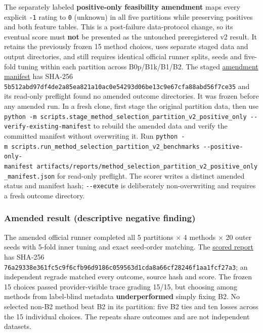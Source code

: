 \documentclass[
  10pt,
]{ctexart}
\begin{document}
The separately labeled \textbf{positive-only feasibility amendment} maps
every explicit \texttt{-1} rating to \texttt{0} (unknown) in all five
partitions while preserving positives and both feature tables. This is a
post-failure data-protocol change, so its eventual score must
\textbf{not} be presented as the untouched preregistered v2 result. It
retains the previously frozen 15 method choices, uses separate staged
data and output directories, and still requires identical official
runner splits, seeds and five-fold tuning within each partition across
B0p/B1k/B1/B2. The staged
\href{../artifacts/reports/method_selection_partition_v2_positive_only_manifest.json}{amendment
manifest} has SHA-256
\texttt{5b512abd97df4d\allowbreak{}e2a85ea821a10a\allowbreak{}c0e54293d06be1\allowbreak{}3c9e67cfa88abd\allowbreak{}56f7ce35}
and its read-only preflight found no amended outcome directories. It was
frozen before any amended run. In a fresh clone, first stage the
original partition data, then use
\texttt{python\ -m\ scripts.\allowbreak{}stage\_\allowbreak{}method\_\allowbreak{}selection\_\allowbreak{}partition\_\allowbreak{}v2\_\allowbreak{}positive\_\allowbreak{}only\ -\/\allowbreak{}-verify-existing-manifest}
to rebuild the amended data and verify the committed manifest without
overwriting it. Run
\texttt{python\ -m\ scripts.\allowbreak{}run\_\allowbreak{}method\_\allowbreak{}selection\_\allowbreak{}partition\_\allowbreak{}v2\_\allowbreak{}benchmarks\ -\/\allowbreak{}-positive-only-manifest\ artifacts/\allowbreak{}reports/\allowbreak{}method\_\allowbreak{}selection\_\allowbreak{}partition\_\allowbreak{}v2\_\allowbreak{}positive\_\allowbreak{}only\_\allowbreak{}manifest.\allowbreak{}json}
for read-only preflight. The scorer writes a distinct amended status and
manifest hash; \texttt{-\/\allowbreak{}-execute} is deliberately non-overwriting and
requires a fresh outcome directory.

\subsubsection{Amended result (descriptive negative
finding)}\label{amended-result-descriptive-negative-finding}

The amended official runner completed all 5 partitions × 4 methods × 20
outer seeds with 5-fold inner tuning and exact seed-order matching. The
\href{../artifacts/reports/method_selection_partition_v2_positive_only_score.json}{scored
report} has SHA-256
\texttt{76a29338e361fc\allowbreak{}5c9f6cfb96d918\allowbreak{}6c059563d1cda8\allowbreak{}a66cf28246f1aa\allowbreak{}1fcf27a3};
an independent regrade matched every outcome, source hash and score. The
frozen 15 choices passed provider-visible trace grading 15/15, but
choosing among methods from label-blind metadata \textbf{underperformed}
simply fixing B2. No selected non-B2 method beat B2 in its partition:
five B2 ties and ten losses across the 15 individual choices. The
repeats share outcomes and are not independent datasets.
\end{document}
